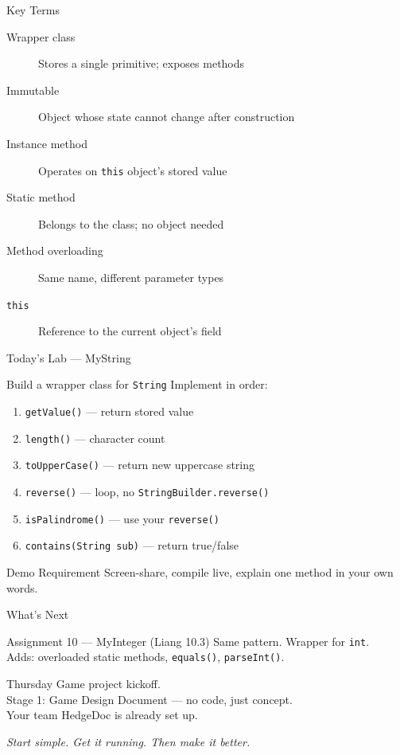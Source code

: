 \documentclass{beamer}
\begin{document}
\begin{frame}{Key Terms}
  \begin{description}
    \item[Wrapper class] Stores a single primitive; exposes methods
    \item[Immutable] Object whose state cannot change after construction
    \item[Instance method] Operates on \texttt{this} object's stored value
    \item[Static method] Belongs to the class; no object needed
    \item[Method overloading] Same name, different parameter types
    \item[\texttt{this}] Reference to the current object's field
  \end{description}
\end{frame}

\begin{frame}{Today's Lab — MyString}
  \begin{block}{Build a wrapper class for \texttt{String}}
    Implement in order:
    \begin{enumerate}
      \item \texttt{getValue()} — return stored value
      \item \texttt{length()} — character count
      \item \texttt{toUpperCase()} — return new uppercase string
      \item \texttt{reverse()} — loop, no \texttt{StringBuilder.reverse()}
      \item \texttt{isPalindrome()} — use your \texttt{reverse()}
      \item \texttt{contains(String sub)} — return true/false
    \end{enumerate}
  \end{block}
  \begin{alertblock}{Demo Requirement}
    Screen-share, compile live, explain one method in your own words.
  \end{alertblock}
\end{frame}

\begin{frame}{What's Next}
  \begin{block}{Assignment 10 — MyInteger (Liang 10.3)}
    Same pattern. Wrapper for \texttt{int}.\\
    Adds: overloaded static methods, \texttt{equals()}, \texttt{parseInt()}.
  \end{block}
  \begin{block}{Thursday}
    Game project kickoff.\\
    Stage 1: Game Design Document — no code, just concept.\\
    Your team HedgeDoc is already set up.
  \end{block}
  \vspace{0.5em}
  \centering\textit{Start simple. Get it running. Then make it better.}
\end{frame}
\end{document}
